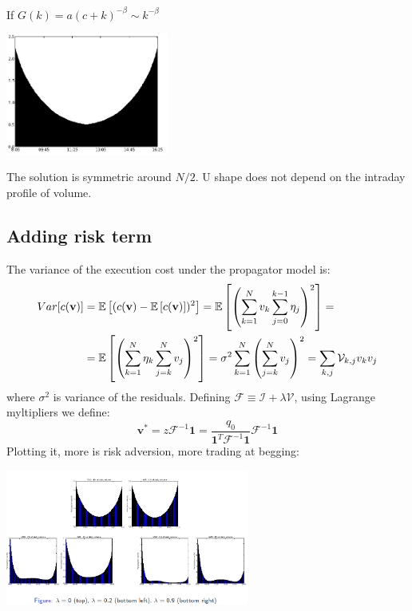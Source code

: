 If $G(k) = a(c+k)^{-\beta} \sim k^{-\beta}$
\begin{center}
	\includegraphics[width=0.4\textwidth]{picture/(13)solution_u_term.png}
\end{center}
The solution is symmetric around $N/2$. U shape does not depend on the intraday profile of volume.\\
\subsection{Adding risk term}
The variance of the execution cost under the propagator model is:
\begin{align*}
	Var[c(\textbf{v})] &= \mathbb{E}\left[(c(\textbf{v}) - \mathbb{E}\left[c(\textbf{v})\right])^2\right] = \mathbb{E}\left[\left(\sum_{k=1}^{N}v_k \sum_{j=0}^{k-1} \eta_j\right)^2\right]=\\
	&= \mathbb{E}\left[\left(\sum_{k=1}^{N}\eta_k \sum_{j=k}^N v_j\right)^2\right] = \sigma^2 \sum_{k=1}^N \left(\sum_{j=k}^N v_j\right)^2 = \sum_{k,j} \mathcal{V}_{k,j}v_kv_j
\end{align*}
where $\sigma^2$ is variance of the residuals. Defining $\mathcal{F} \equiv \mathcal{I} + \lambda \mathcal{V}$, using Lagrange myltipliers we define:
\[
\mathbf{v}^* = z \mathcal{F}^{-1} \mathbf{1} = \frac{q_0}{\mathbf{1}^T\mathcal{F}^{-1}\mathbf{1}}\mathcal{F}^{-1}\mathbf{1}
\]
Plotting it, more is risk adversion, more trading at begging:
\begin{center}
	\includegraphics[width=0.6\textwidth]{picture/(14)solution_u_term_risk.png}
\end{center}

